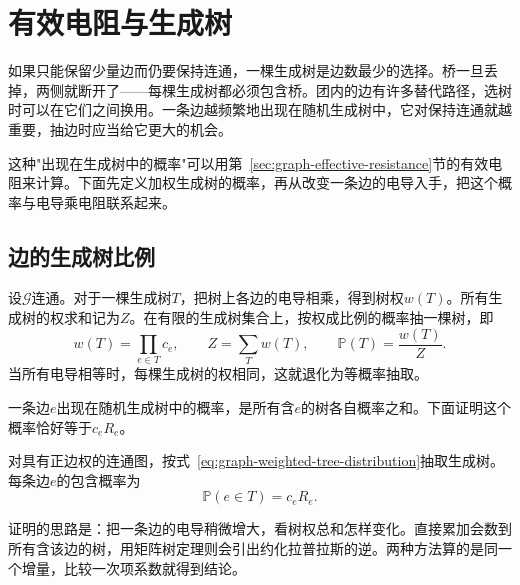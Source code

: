 \section{有效电阻与生成树}
\label{sec:graph-sparsification-resistance-trees}

如果只能保留少量边而仍要保持连通，一棵生成树是边数最少的选择。桥一旦丢掉，两侧就断开了——每棵生成树都必须包含桥。团内的边有许多替代路径，选树时可以在它们之间换用。一条边越频繁地出现在随机生成树中，它对保持连通就越重要，抽边时应当给它更大的机会。

这种"出现在生成树中的概率"可以用第~\ref{sec:graph-effective-resistance}节的有效电阻来计算。下面先定义加权生成树的概率，再从改变一条边的电导入手，把这个概率与电导乘电阻联系起来。

\subsection{边的生成树比例}
\label{sec:graph-tree-edge-probability}

设$\mathcal G$连通。对于一棵生成树$T$，把树上各边的电导相乘，得到树权$w(T)$。所有生成树的权求和记为$Z$。在有限的生成树集合上，按权成比例的概率抽一棵树，即
\begin{equation}
w(T)=\prod_{e\in T}c_e,
\qquad
Z=\sum_T w(T),
\qquad
\mathbb P(T)=\frac{w(T)}{Z}.
\label{eq:graph-weighted-tree-distribution}
\end{equation}
当所有电导相等时，每棵生成树的权相同，这就退化为等概率抽取。

一条边$e$出现在随机生成树中的概率，是所有含$e$的树各自概率之和。下面证明这个概率恰好等于$c_eR_e$。

\begin{theorem}[生成树的边包含概率]
\label{thm:graph-tree-edge-probability}
对具有正边权的连通图，按式~\eqref{eq:graph-weighted-tree-distribution}抽取生成树。每条边$e$的包含概率为
\begin{equation}
\mathbb P(e\in T)=c_eR_e.
\label{eq:graph-tree-edge-probability}
\end{equation}
\end{theorem}

证明的思路是：把一条边的电导稍微增大，看树权总和怎样变化。直接累加会数到所有含该边的树，用矩阵树定理则会引出约化拉普拉斯的逆。两种方法算的是同一个增量，比较一次项系数就得到结论。

